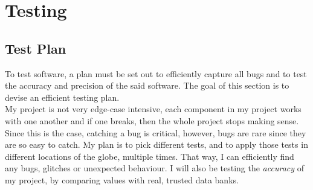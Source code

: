 \chapter{Testing}
\section{Test Plan}
To test software, a plan must be set out to efficiently capture all bugs and to test the accuracy and precision of the said software. The goal of this section is to devise an efficient testing plan. \\
My project is not very edge-case intensive, each component in my project works with one another and if one breaks, then the whole project stops making sense. Since this is the case, catching a bug is critical, however, bugs are rare since they are so easy to catch. My plan is to pick different tests, and to apply those tests in different locations of the globe, multiple times. That way, I can efficiently find any bugs, glitches or unexpected behaviour. I will also be testing the \textit{accuracy} of my project, by comparing values with real, trusted data banks.
\newpage
